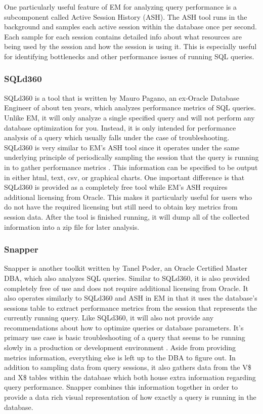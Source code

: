 \documentclass[draftclsnofoot, onecolumn, compsoc, 10pt]{IEEEtran}
\begin{document}
One particularly useful feature of EM for analyzing query performance is a subcomponent called Active Session History (ASH). 
The ASH tool runs in the background and samples each active session within the database once per second. 
Each sample for each session contains detailed info about what resources are being used by the session and how the session is using it. 
This is especially useful for identifying bottlenecks and other performance issues of running SQL queries.

\subsubsection{SQLd360}
SQLd360 is a tool that is written by Mauro Pagano, an ex-Oracle Database Engineer of about ten years, which analyzes performance metrics of SQL queries.
Unlike EM, it will only analyze a single specified query and will not perform any database optimization for you.  
Instead, it is only intended for performance analysis of a query which usually falls under the case of troubleshooting. 
SQLd360 is very similar to EM’s ASH tool since it operates under the same underlying principle of periodically sampling the session that the query is running in to gather performance metrics \cite{Mauro Pagano's Blog}. 
This information can be specified to be output in either html, text, csv, or graphical charts. One important difference is that SQLd360 is provided as a completely free tool while EM’s ASH requires additional licensing from Oracle. 
This makes it particularly useful for users who do not have the required licensing but still need to obtain key metrics from session data. 
After the tool is finished running, it will dump all of the collected information into a zip file for later analysis.

\subsubsection{Snapper}
Snapper is another toolkit written by Tanel Poder, an Oracle Certified Master DBA, which also analyzes SQL queries. 
Similar to SQLd360, it is also provided completely free of use and does not require additional licensing from Oracle. 
It also operates similarly to SQLd360 and ASH in EM in that it uses the database's sessions table to extract performance metrics from the session that represents the currently running query. 
Like SQLd360, it will also not provide any recommendations about how to optimize queries or database parameters.
It's primary use case is basic troubleshooting of a query that seems to be running slowly in a production or development environment \cite{tech.E2SN}. 
Aside from providing metrics information, everything else is left up to the DBA to figure out.
In addition to sampling data from query sessions, it also gathers data from the V\$ and X\$ tables within the database which both house extra information regarding query performance. 
Snapper combines this information together in order to provide a data rich visual representation of how exactly a query is running in the database. 
\end{document}
